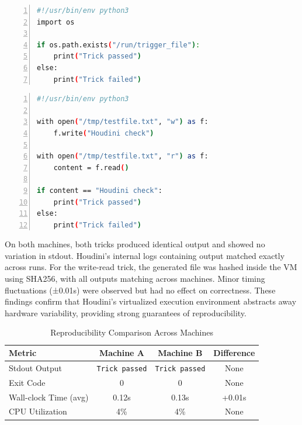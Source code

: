 \documentclass[12pt]{report}
\begin{document}
\begin{doublespace}
\begin{lstlisting}[language=bash, caption={Trick \#1}, label={lst:escape-trick}, numbers=left, numberstyle=\tiny, stepnumber=1, frame=single, breaklines=true, backgroundcolor=\color{gray!10}, basicstyle=\ttfamily\footnotesize, showspaces=false, showstringspaces=false]
#!/usr/bin/env python3
import os

if os.path.exists("/run/trigger_file"):
    print("Trick passed")
else:
    print("Trick failed")
\end{lstlisting}

\begin{lstlisting}[language=bash, caption={Trick \#2}, label={lst:escape-trick}, numbers=left, numberstyle=\tiny, stepnumber=1, frame=single, breaklines=true, backgroundcolor=\color{gray!10}, basicstyle=\ttfamily\footnotesize, showspaces=false, showstringspaces=false]
#!/usr/bin/env python3

with open("/tmp/testfile.txt", "w") as f:
    f.write("Houdini check")

with open("/tmp/testfile.txt", "r") as f:
    content = f.read()

if content == "Houdini check":
    print("Trick passed")
else:
    print("Trick failed")
\end{lstlisting}

On both machines, both tricks produced identical output and showed no variation in stdout. Houdini’s internal logs containing output matched exactly across runs. For the write-read trick, the generated file was hashed inside the VM using SHA256, with all outputs matching across machines. Minor timing fluctuations (±0.01s) were observed but had no effect on correctness. These findings confirm that Houdini's virtualized execution environment abstracts away hardware variability, providing strong guarantees of reproducibility.

\begin{table}[h]
\centering
\caption{Reproducibility Comparison Across Machines}
\label{tab:reproducibility-results}
\begin{tabular}{|l|c|c|c|}
\hline
\textbf{Metric} & \textbf{Machine A} & \textbf{Machine B} & \textbf{Difference} \\
\hline
Stdout Output & \texttt{Trick passed} & \texttt{Trick passed} & None \\
Exit Code & 0 & 0 & None \\
Wall-clock Time (avg) & 0.12s & 0.13s & +0.01s \\
CPU Utilization & 4\% & 4\% & None \\
\hline
\end{tabular}
\end{table}


\end{doublespace}
\end{document}
